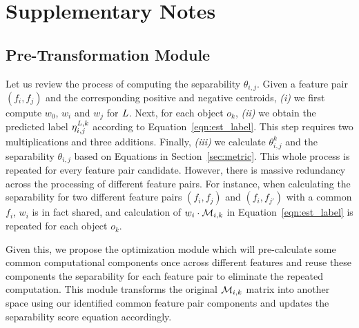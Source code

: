 \section{Supplementary Notes}

\subsection{Pre-Transformation Module} \label{app:trans}
Let us review the process of computing the separability $\theta_{i,j}$. Given a feature pair $(f_i,f_j)$ and the corresponding positive and negative centroids, {\em (i)} we first compute $w_0$, $w_i$ and $w_j$ for $\mathit{L}$. Next, for each object $o_k$, {\em (ii)} we obtain the predicted label $\eta_{i,j}^{\mathit{L},k}$ according to Equation~\ref{eqn:est_label}. This step requires two multiplications and three additions. Finally, {\em (iii)} we calculate $\theta_{i,j}^{k}$ and the separability $\theta_{i,j}$ based on Equations in Section~\ref{sec:metric}. This whole process is repeated for every feature pair candidate. However, there is massive redundancy across the processing of different feature pairs. For instance, when calculating the separability for two different feature pairs $(f_i,f_j)$ and $(f_i,f_{j'})$ with a common $f_i$, $w_i$ is in fact shared, and calculation of $w_i\cdot {\mathcal{M}}_{i,k}$ in Equation~\ref{eqn:est_label} is repeated for each object $o_k$.

Given this, we propose the \trans optimization module which will pre-calculate some common computational components once across different features and reuse these components the separability for each feature pair to eliminate the repeated computation. This \trans module transforms the original ${\mathcal{M}}_{i,k}$ matrix into another space using our identified common feature pair components and updates the separability score equation accordingly.

